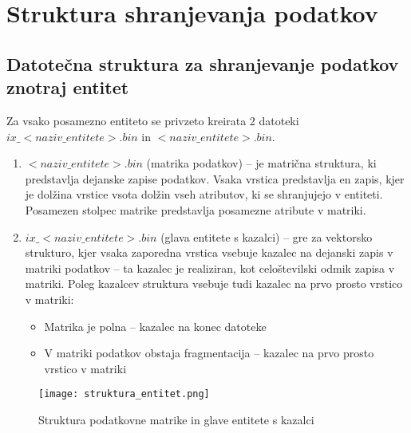 \documentclass[a4paper,12pt,openright]{book}
\begin{document}
    \section{Struktura shranjevanja podatkov}
        \subsection{Datotečna struktura za shranjevanje podatkov znotraj entitet}
        Za vsako posamezno entiteto se privzeto kreirata 2 datoteki $ix\_<naziv\_entitete>.bin$ in $<naziv\_entitete>.bin$.
        \begin{enumerate}
            \item $<naziv\_entitete>.bin$ (matrika podatkov) – je matrična struktura, ki predstavlja dejanske zapise podatkov. Vsaka vrstica predstavlja en zapis, kjer je dolžina vrstice vsota dolžin vseh atributov, ki se shranjujejo v entiteti. Posamezen stolpec matrike predstavlja posamezne atribute v matriki.
            \item $ix\_<naziv\_entitete>.bin$ (glava entitete s kazalci) – gre za vektorsko strukturo, kjer vsaka zaporedna vrstica vsebuje kazalec na dejanski zapis v matriki podatkov – ta kazalec je realiziran, kot celoštevilski odmik zapisa v matriki. Poleg kazalcev struktura vsebuje tudi kazalec na prvo prosto vrstico v matriki:
            \begin{itemize}
                \item Matrika je polna – kazalec na konec datoteke
                \item V matriki podatkov obstaja fragmentacija – kazalec na prvo prosto vrstico v matriki 
            \end{itemize}
        \end{enumerate}

        \begin{figure}[h]
            \centerline{\texttt{[image: struktura\_entitet.png]}}
            \caption{Struktura podatkovne matrike in glave entitete s kazalci}
            \label{sl:mindmap}
        \end{figure}
        
\end{document}
